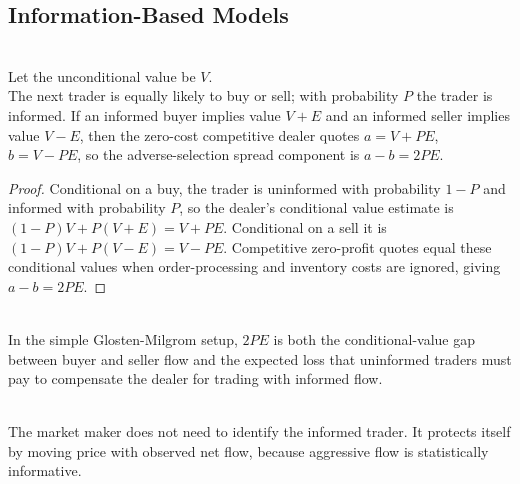 \subsection{Information-Based Models}

\begin{proposition} \\
Let the unconditional value be $V$.\\
The next trader is equally likely to buy or sell; with probability $P$ the trader is informed. If an informed buyer implies value $V+E$ and an informed seller implies value $V-E$, then the zero-cost competitive dealer quotes $a=V+PE$, $b=V-PE$, so the adverse-selection spread component is $a-b=2PE$.
\begin{proof}
Conditional on a buy, the trader is uninformed with probability $1-P$ and informed with probability $P$, so the dealer's conditional value estimate is $(1-P)V+P(V+E)=V+PE$. Conditional on a sell it is $(1-P)V+P(V-E)=V-PE$. Competitive zero-profit quotes equal these conditional values when order-processing and inventory costs are ignored, giving $a-b=2PE$.
\end{proof}
\end{proposition}

\begin{principle} \\
In the simple Glosten-Milgrom setup, $2PE$ is both the conditional-value gap between buyer and seller flow and the expected loss that uninformed traders must pay to compensate the dealer for trading with informed flow.
\end{principle}


\begin{principle} \\
The market maker does not need to identify the informed trader. It protects itself by moving price with observed net flow, because aggressive flow is statistically informative.
\end{principle}
